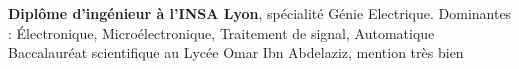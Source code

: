 %
%
%


\begin{scholarship}
					{\textbf{Diplôme d'ingénieur à l'INSA Lyon}, spécialité Génie Electrique.
					Dominantes : Électronique, Microélectronique, Traitement de signal, Automatique}
					{Baccalauréat scientifique au Lycée Omar Ibn Abdelaziz, mention très bien}
\end{scholarship}
